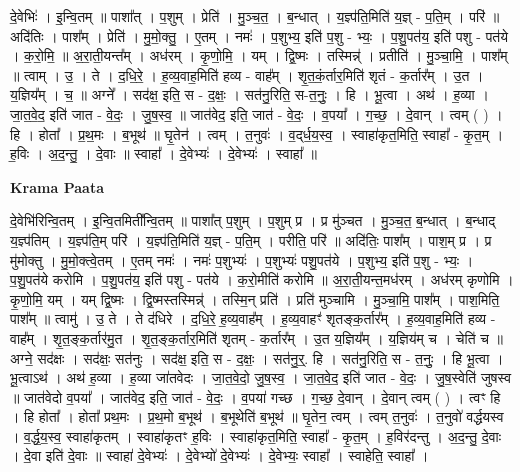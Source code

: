 \documentclass[17pt]{extarticle}
\begin{document}
दे॒वेभिः॑ । इ॒न्वि॒तम् ॥ पाशा᳚त् । प॒शुम् । प्रेति॑ । मु॒ञ्च॒त॒ । ब॒न्धात् । य॒ज्ञ्प॑ति॒मिति॑ य॒ज्ञ् - प॒ति॒म् । परि॑ ॥ अदि॑तिः । पाश᳚म् । प्रेति॑ । मु॒मो॒क्तु॒ । ए॒तम् । नमः॑ । प॒शुभ्य॒ इति॑ प॒शु - भ्यः॒ । प॒शु॒पत॑य॒ इति॑ पशु - पत॑ये । क॒रो॒मि॒ ॥ अ॒रा॒ती॒यन्त᳚म् । अध॑रम् । कृ॒णो॒मि॒ । यम् । द्वि॒ष्मः । तस्मिन्न्॑ । प्रतीति॑ । मु॒ञ्चा॒मि॒ । पाश᳚म् ॥ त्वाम् । उ॒ । ते । द॒धि॒रे॒ । ह॒व्य॒वाह॒मिति॑ हव्य - वाह᳚म् । शृ॒त॒कं॒र्तार॒मिति॑ शृतं - क॒र्तार᳚म् । उ॒त । य॒ज्ञिय᳚म् । च॒ ॥ अग्ने᳚ । सद॑क्ष॒ इति॒ स - द॒क्षः॒ । सत॑नु॒रिति॒ स-त॒नुः॒ । हि । भू॒त्वा । अथ॑ । ह॒व्या । जा॒त॒वे॒द॒ इति॑ जात - वे॒दः॒ । जु॒ष॒स्व॒ ॥ जात॑वेद॒ इति॒ जात॑ - वे॒दः॒ । व॒पया᳚ । ग॒च्छ॒ । दे॒वान् । त्वम् ( ) । हि । होता᳚ । प्र॒थ॒मः । ब॒भूथ॑ ॥ घृ॒तेन॑ । त्वम् । त॒नुवः॑ । व॒द्‌र्ध॒य॒स्व॒ । स्वाहा॑कृत॒मिति॒ स्वाहा᳚ - कृ॒त॒म् । ह॒विः । अ॒द॒न्तु॒ । दे॒वाः ॥ स्वाहा᳚ । दे॒वेभ्यः॑ । दे॒वेभ्यः॑ । स्वाहा᳚ ॥  \newline


\textbf{Krama Paata} \newline

दे॒वेभि॑रिन्वि॒तम् । इ॒न्वि॒तमिती᳚न्वि॒तम् ॥ पाशा᳚त् प॒शुम् । प॒शुम् प्र । प्र मु॑ञ्चत । मु॒ञ्च॒त॒ ब॒न्धात् । ब॒न्धाद् य॒ज्ञ्प॑तिम् । य॒ज्ञ्प॑ति॒म् परि॑ । य॒ज्ञ्प॑ति॒मिति॑ य॒ज्ञ् - प॒ति॒म् । परीति॒ परि॑ ॥ अदि॑तिः॒ पाश᳚म् । पाश॒म् प्र । प्र मु॑मोक्तु । मु॒मो॒क्त्वे॒तम् । ए॒तम् नमः॑ । नमः॑ प॒शुभ्यः॑ । प॒शुभ्यः॑ पशु॒पत॑ये । प॒शुभ्य॒ इति॑ प॒शु - भ्यः॒ । प॒शु॒पत॑ये करोमि । प॒शु॒पत॑य॒ इति॑ पशु - पत॑ये । क॒रो॒मीति॑ करोमि ॥ अ॒रा॒ती॒यन्त॒मध॑रम् । अध॑रम् कृणोमि । कृ॒णो॒मि॒ यम् । यम् द्वि॒ष्मः । द्वि॒ष्मस्तस्मिन्न्॑ । तस्मि॒न् प्रति॑ । प्रति॑ मुञ्चामि । मु॒ञ्चा॒मि॒ पाश᳚म् । पाश॒मिति॒ पाश᳚म् ॥ त्वामु॑ । उ॒ ते । ते द॑धिरे । द॒धि॒रे॒ ह॒व्य॒वाह᳚म् । ह॒व्य॒वाहꣳ॑ शृतङ्क॒र्तार᳚म् । ह॒व्य॒वाह॒मिति॑ हव्य - वाह᳚म् । शृ॒त॒ङ्क॒र्तार॑मु॒त । शृ॒त॒ङ्क॒र्तार॒मिति॑ शृतम् - क॒र्तार᳚म् । उ॒त य॒ज्ञिय᳚म् । य॒ज्ञिय॑म् च । चेति॑ च ॥ अग्ने॒ सद॑क्षः । सद॑क्षः॒ सत॑नुः । सद॑क्ष॒ इति॒ स - द॒क्षः॒ । सत॑नु॒र्॒. हि । सत॑नु॒रिति॒ स - त॒नुः॒ । हि भू॒त्वा । भू॒त्वाऽथ॑ । अथ॑ ह॒व्या । ह॒व्या जा॑तवेदः । जा॒त॒वे॒दो॒ जु॒ष॒स्व॒ । जा॒त॒वे॒द॒ इति॑ जात - वे॒दः॒ । जु॒ष॒स्वेति॑ जुषस्व ॥ जात॑वेदो व॒पया᳚ । जात॑वेद॒ इति॒ जात॑ - वे॒दः॒ । व॒पया॑ गच्छ । ग॒च्छ॒ दे॒वान् । दे॒वान् त्वम् ( ) । त्वꣳ हि । हि होता᳚ । होता᳚ प्रथ॒मः । प्र॒थ॒मो ब॒भूथ॑ । ब॒भूथेति॑ ब॒भूथ॑ ॥ घृ॒तेन॒ त्वम् । त्वम् त॒नुवः॑ । त॒नुवो॑ वर्द्धयस्व । व॒र्द्ध॒य॒स्व॒ स्वाहा॑कृतम् । स्वाहा॑कृतꣳ ह॒विः । स्वाहा॑कृत॒मिति॒ स्वाहा᳚ - कृ॒त॒म् । ह॒विर॑दन्तु । अ॒द॒न्तु॒ दे॒वाः । दे॒वा इति॑ दे॒वाः ॥ स्वाहा॑ दे॒वेभ्यः॑ । दे॒वेभ्यो॑ दे॒वेभ्यः॑ । दे॒वेभ्यः॒ स्वाहा᳚ । स्वाहेति॒ स्वाहा᳚ । \newline
\end{document}
